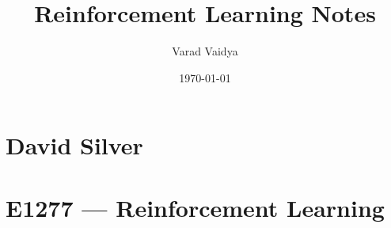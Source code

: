 \documentclass[working,a4paper,11pt]{article}
\title{Reinforcement Learning Notes}
\author{Varad Vaidya}
\date{\today}
\begin{document}
  \createintro

  \part{David Silver}
  
  \clearpage
  
  \clearpage
  
  \clearpage
  
  \clearpage
  
  \clearpage
  
  \clearpage
  
  \clearpage
  
  \clearpage
  \part{E1277 --- Reinforcement Learning}
  
  
\end{document}
